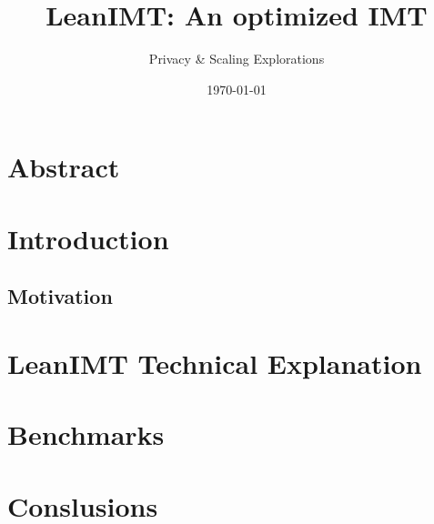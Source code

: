\documentclass{article}
\title{LeanIMT: An optimized IMT}
\author{Privacy \& Scaling Explorations}
\date{\today}
\begin{document}
\maketitle

\section{Abstract}

\newpage
\tableofcontents
\newpage

\section{Introduction}

\subsection{Motivation}

\section{LeanIMT Technical Explanation}

\section{Benchmarks}

\section{Conslusions}

\end{document}
